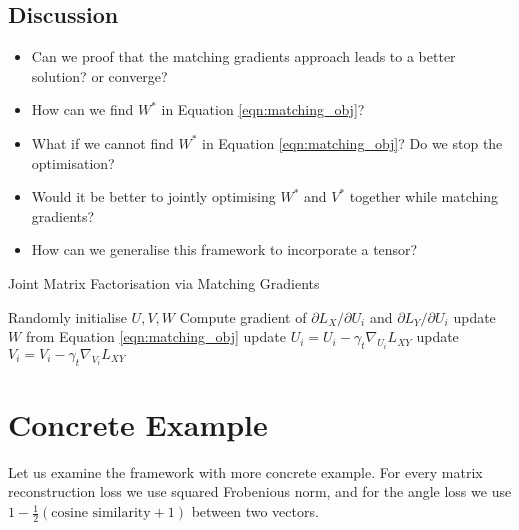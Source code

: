 \documentclass{article} %
\theoremstyle{definition}
\begin{document}
\subsection{Discussion}

\begin{itemize}
\item Can we proof that the matching gradients approach leads to a better solution? or converge?
\item How can we find $W^*$ in Equation \ref{eqn:matching_obj}?
\item What if we cannot find $W^*$ in Equation \ref{eqn:matching_obj}? Do we stop the optimisation?
\item Would it be better to jointly optimising $W^*$ and $V^*$ together while matching gradients?
\item How can we generalise this framework to incorporate a tensor?
\end{itemize}

\begin{algorithm}  
  \caption{Joint Matrix Factorisation via Matching Gradients \label{alg:jmfgm}}
  \begin{algorithmic}
    \Statex
    \State Randomly initialise $U, V, W$
      	\State Compute gradient of ${\partial L_X}/{\partial U_i}$ and ${\partial L_Y}/{\partial U_i}$
        	\State update $W$ from Equation \ref{eqn:matching_obj}
        \EndWhile
        \State update $U_i = U_i - \gamma_t \nabla_{U_i} L_{XY}$
        \State update $V_i = V_i - \gamma_t \nabla_{V_i} L_{XY}$        
      \EndFor  
    \EndFor
      \State {}
    \EndFunction
  \end{algorithmic}  
\end{algorithm}

\begin{algorithm}
\end{algorithm}

\section{Concrete Example}
Let us examine the framework with more concrete example. For every matrix reconstruction loss we use squared Frobenious norm, and for the angle loss we use $1 - \frac{1}{2}(\text{cosine similarity}+1)$ between two vectors.
\end{document}
